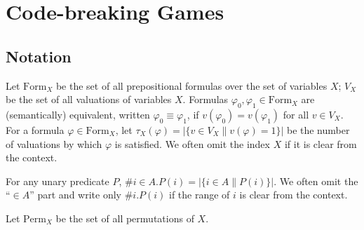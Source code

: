 \chapter{Code-breaking Games}

\newcommand{\Val}{V} %
\newcommand{\val}{v} %
\newcommand{\numval}{\tau} %
\renewcommand{\Form}{\textrm{Form}} %
\newcommand{\form}{\varphi} %
\newcommand{\aform}[1]{\form_{0..#1}} %

\newcommand{\game}{\mathcal{G}}
\newcommand{\Var}{X}
\newcommand{\init}{\varphi_0}
\newcommand{\Expt}{T}
\newcommand{\expt}{t}
\newcommand{\Exp}{E}
\renewcommand{\exp}{e}
\newcommand{\param}{p}
\newcommand{\infer}{\Phi}

\newcommand{\Perm}{\textrm{Perm}}
\newcommand{\perm}{\pi}
\newcommand{\result}{\rho}

\newcommand{\stg}{\sigma}

\newcommand{\proc}{\pi}
\newcommand{\procstg}[2]{\proc_{#1,#2}}

\newcommand{\len}{\lambda}
\newcommand{\lenstg}[2]{\len^{#1,#2}}
\newcommand{\lenmax}[1]{\len^{#1}}
\newcommand{\lenexp}[1]{\len^{#1}_\textrm{exp}}

\newcommand{\exactly}[1]{\textrm{Exactly-#1}\:}
\newcommand{\atleast}[1]{\textrm{AtLeast-#1}\:}
\newcommand{\atmost}[1]{\textrm{AtMost-#1}\:}

\section[0]{Notation}
Let $\Form_\Var$ be the set of all prepositional formulas over
  the set of variables $\Var$;
  $\Val_\Var$ be the set of all valuations of variables $\Var$.
Formulas $\form_0, \form_1 \in \Form_\Var$ are (semantically) equivalent,
  written $\form_0 \equiv \form_1$, if
  $\val(\form_0) = \val(\form_1)$ for all $\val\in\Val_\Var$.
For a formula $\form\in\Form_\Var$, let
  $\numval_\Var(\form) = |\{ \val\in\Val_\Var \| \val(\form) = 1 \}|$
  be the number of valuations by which $\form$ is satisfied.
We often omit the index $\Var$ if it is clear from the context.

For any unary predicate $P$, $\#i\in A.P(i) = |\{ i\in A \| P(i)\}|$.
  We often omit the ``$\in A$'' part and write only $\#i.P(i)$
  if the range of $i$ is clear from the context.

Let $\Perm_\Var$ be the set of all permutations of $\Var$.

